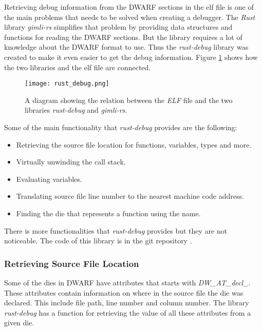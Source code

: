 
Retrieving debug information from the \gls{DWARF} sections in the \gls{elf} file is one of the main problems that needs to be solved when creating a debugger.
The \emph{Rust} library \emph{gimli-rs} simplifies that problem by providing data structures and functions for reading the \gls{DWARF} sections.
But the library requires a lot of knowledge about the \gls{DWARF} format to use.
Thus the \emph{rust-debug} library was created to make it even easier to get the debug information.
Figure \ref{fig:rustdebug} shows how the two libraries and the \gls{elf} file are connected.


\begin{figure}[h]
	\centering
	\texttt{[image: rust\_debug.png]}
	\caption{A diagram showing the relation between the \emph{ELF} file and the two libraries \emph{rust-debug} and \emph{gimli-rs}.}
	\label{fig:rustdebug}
\end{figure}


Some of the main functionality that \emph{rust-debug} provides are the following:

\begin{itemize}
  \item Retrieving the source file location for functions, variables, types and more.
  \item Virtually unwinding the call stack.
  \item Evaluating variables.
  \item Translating source file line number to the nearest machine code address.
  \item Finding the \gls{die} that represents a function using the name.
\end{itemize}

There is more functionalities that \emph{rust-debug} provides but they are not noticeable.
The code of this library is in the git repository \cite{rust-debug}.



\subsubsection{Retrieving Source File Location}
Some of the \glspl{die} in \gls{DWARF} have attributes that starts with \emph{DW\_AT\_decl\_}.
These attributes contain information on where in the source file the \gls{die} was declared.
This include file path, line number and column number.
The library \emph{rust-debug} has a function for retrieving the value of all these attributes from a given \gls{die}.


